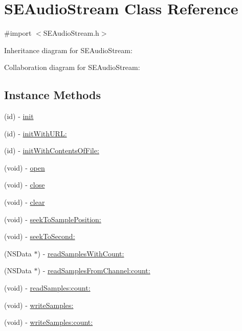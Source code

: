 \hypertarget{interface_s_e_audio_stream}{\section{S\-E\-Audio\-Stream Class Reference}
\label{interface_s_e_audio_stream}
}


{\ttfamily \#import $<$S\-E\-Audio\-Stream.\-h$>$}



Inheritance diagram for S\-E\-Audio\-Stream\-:


Collaboration diagram for S\-E\-Audio\-Stream\-:
\subsection*{Instance Methods}
\begin{DoxyCompactItemize}
\item 
(id) -\/ \hyperlink{interface_s_e_audio_stream_adfb80527c355e64279d60a7b1af838ea}{init}
\item 
(id) -\/ \hyperlink{interface_s_e_audio_stream_a7acd0370d5f5066a6d00834af0eea200}{init\-With\-U\-R\-L\-:}
\item 
(id) -\/ \hyperlink{interface_s_e_audio_stream_a88b28dfe93892a08d261bd946beea26f}{init\-With\-Contents\-Of\-File\-:}
\item 
(void) -\/ \hyperlink{interface_s_e_audio_stream_add81dd9d9bd838f3a5dc1ceae94ccf26}{open}
\item 
(void) -\/ \hyperlink{interface_s_e_audio_stream_a8c4af367964e8be4817df12989f06d40}{close}
\item 
(void) -\/ \hyperlink{interface_s_e_audio_stream_ae59699f3f9cdf5fa000d9835da89e73e}{clear}
\item 
(void) -\/ \hyperlink{interface_s_e_audio_stream_a1dd26e76fbcd65f2d221f61de75fd3eb}{seek\-To\-Sample\-Position\-:}
\item 
(void) -\/ \hyperlink{interface_s_e_audio_stream_a720083efde7839f0a44ec7456805ffeb}{seek\-To\-Second\-:}
\item 
(N\-S\-Data $\ast$) -\/ \hyperlink{interface_s_e_audio_stream_a8d848d7a388d38fb670eb92e3bf6566d}{read\-Samples\-With\-Count\-:}
\item 
(N\-S\-Data $\ast$) -\/ \hyperlink{interface_s_e_audio_stream_a4501c22126f23cc1cb9ecbd1d7ddda6e}{read\-Samples\-From\-Channel\-:count\-:}
\item 
(void) -\/ \hyperlink{interface_s_e_audio_stream_ac80704c916ddbac8f8309f3a6a019e80}{read\-Samples\-:count\-:}
\item 
(void) -\/ \hyperlink{interface_s_e_audio_stream_ab184f74429643065a116a8f272bf79b3}{write\-Samples\-:}
\item 
(void) -\/ \hyperlink{interface_s_e_audio_stream_af19a129d2a78172d771f2552dd97f49b}{write\-Samples\-:count\-:}
\end{DoxyCompactItemize}
